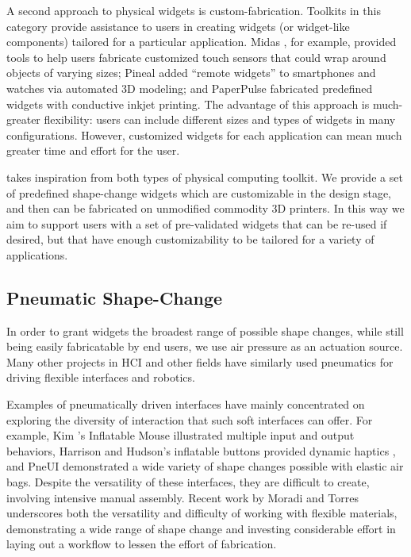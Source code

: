       A second approach to physical widgets is custom-fabrication. Toolkits in
      this category provide assistance to users in creating widgets (or
      widget-like components) tailored for a particular application. Midas
      \cite{Savage:2012ev}, for example, provided tools to help users fabricate
      customized touch sensors that could wrap around objects of varying sizes;
      Pineal \cite{Ledo:2017ks} added ``remote widgets'' to smartphones and
      watches via automated 3D modeling; and PaperPulse \cite{Ramakers:2015gi}
      fabricated predefined widgets with conductive inkjet printing. The
      advantage of this approach is much-greater flexibility: users can include
      different sizes and types of widgets in many configurations. However,
      customized widgets for each application can mean much greater time and
      effort for the user.
      
      \mp takes inspiration from both types of physical computing toolkit. We
      provide a set of predefined shape-change widgets which are customizable in
      the design stage, and then can be fabricated on unmodified commodity 3D
      printers. In this way we aim to support users with a set of pre-validated
      widgets that can be re-used if desired, but that have enough
      customizability to be tailored for a variety of applications.
        
    \subsection{Pneumatic Shape-Change}
      In order to grant \mp widgets the broadest range of possible shape
      changes, while still being easily fabricatable by end users, we use air
      pressure as an actuation source. Many other projects in HCI and other
      fields have similarly used pneumatics for driving flexible interfaces and
      robotics.

      Examples of pneumatically driven interfaces have mainly concentrated on
      exploring the diversity of interaction that such soft interfaces can
      offer. For example, Kim \etal's Inflatable Mouse \cite{Kim:2008du}
      illustrated multiple input and output behaviors, Harrison and Hudson's
      inflatable buttons provided dynamic haptics \cite{Harrison:2009}, and
      PneUI \cite{Yao:2013bg} demonstrated a wide variety of shape changes
      possible with elastic air bags. Despite the versatility of these
      interfaces, they are difficult to create, involving intensive manual
      assembly. Recent work by Moradi and Torres \cite{Moradi:2020} underscores
      both the versatility and difficulty of working with flexible materials,
      demonstrating a wide range of shape change and investing considerable
      effort in laying out a workflow to lessen the effort of fabrication.


